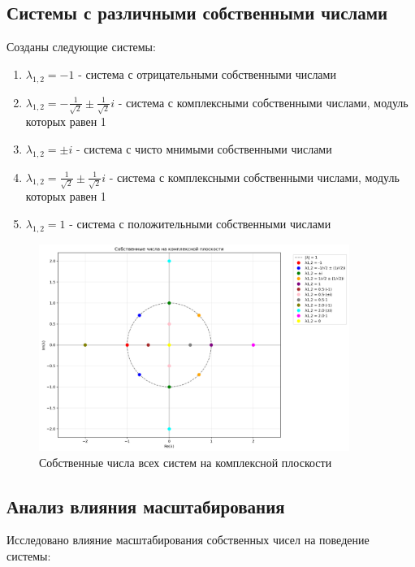 \subsection*{Системы с различными собственными числами}

Созданы следующие системы:

\begin{enumerate}
    \item $\lambda_{1,2} = -1$ - система с отрицательными собственными числами
    \item $\lambda_{1,2} = -\frac{1}{\sqrt{2}} \pm \frac{1}{\sqrt{2}}i$ - система с комплексными собственными числами, модуль которых равен 1
    \item $\lambda_{1,2} = \pm i$ - система с чисто мнимыми собственными числами
    \item $\lambda_{1,2} = \frac{1}{\sqrt{2}} \pm \frac{1}{\sqrt{2}}i$ - система с комплексными собственными числами, модуль которых равен 1
    \item $\lambda_{1,2} = 1$ - система с положительными собственными числами
\end{enumerate}

\begin{figure}[H]
    \centering
    \includegraphics[width=0.9\textwidth]{images/task2/eigenvalues_complex_plane.png}
    \caption{Собственные числа всех систем на комплексной плоскости}
\end{figure}

\subsection*{Анализ влияния масштабирования}

Исследовано влияние масштабирования собственных чисел на поведение системы:

